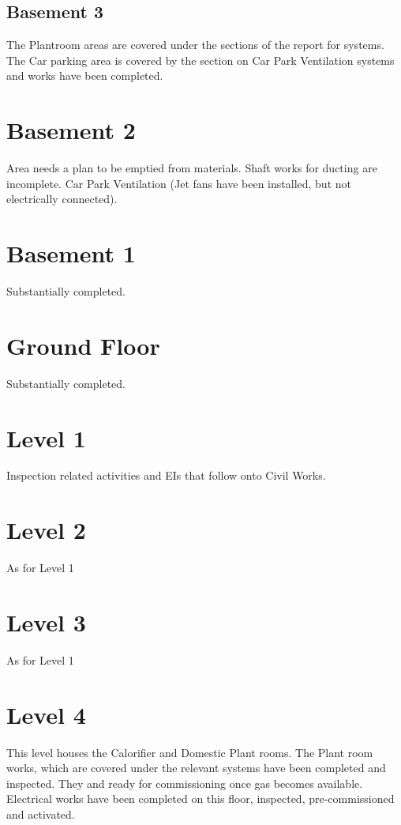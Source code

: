 \subsection{Basement 3}

The Plantroom areas are covered under the sections of the report for systems. The Car parking area is covered by the section on Car Park Ventilation systems and works have been completed.


\section{Basement 2}

Area needs a plan to be emptied from materials. Shaft works for ducting are incomplete. Car Park Ventilation (Jet fans have been installed, but not 
electrically connected).

\section{Basement 1}

Substantially completed. 

\section{Ground Floor}

Substantially completed.

\section{Level 1}
Inspection related activities and EIs that follow onto Civil Works.

\section{Level 2}
As for Level 1
\section{Level 3}
As for Level 1

\section{Level 4}

This level houses the Calorifier and Domestic Plant rooms. The Plant room works, which are covered under the relevant systems have been completed and inspected. They and ready for commissioning once gas becomes available. Electrical works have been completed on this floor, inspected, pre-commissioned and activated.

